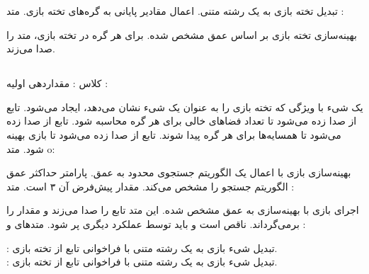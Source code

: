 تبدیل تخته بازی به یک رشته متنی.
اعمال مقادیر پایانی به گره‌های تخته بازی.
متد :

بهینه‌سازی تخته بازی بر اساس عمق مشخص شده.
برای هر گره در تخته بازی، متد  را صدا می‌زند.

\subsection{}

کلاس :
مقداردهی اولیه :

یک شیء  با ویژگی  که تخته بازی را به عنوان یک شیء  نشان می‌دهد، ایجاد می‌شود.
تابع  از  صدا زده می‌شود تا تعداد فضاهای خالی برای هر گره محاسبه شود.
تابع  از  صدا زده می‌شود تا همسایه‌ها برای هر گره پیدا شوند.
تابع  از  صدا زده می‌شود تا بازی بهینه شود.
متد o:

بهینه‌سازی بازی با اعمال یک الگوریتم جستجوی محدود به عمق.
پارامتر  حداکثر عمق الگوریتم جستجو را مشخص می‌کند. مقدار پیش‌فرض آن ۳ است.
	متد :
	
	اجرای بازی با بهینه‌سازی به عمق مشخص شده.
	این متد تابع  را صدا می‌زند و مقدار  را برمی‌گرداند.
ناقص است و باید توسط عملکرد دیگری پر شود.
متدهای  و :

: تبدیل شیء بازی به یک رشته متنی با فراخوانی تابع  از تخته بازی.\\
: تبدیل شیء بازی به یک رشته متنی با فراخوانی تابع  از تخته بازی.\\
